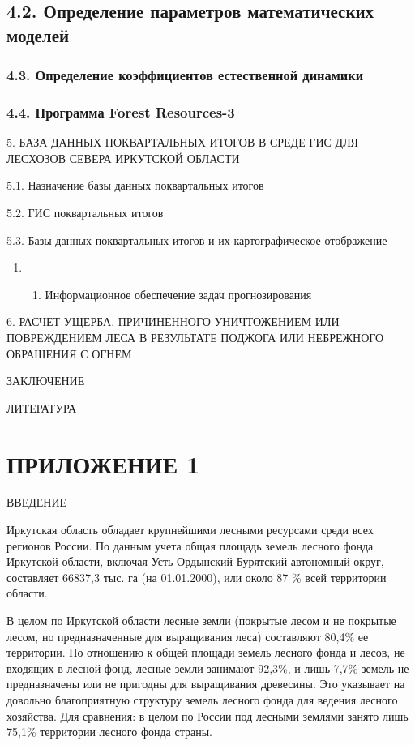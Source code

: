 \documentclass{report}
\begin{document}
\subsection[4.2. \ Определение параметров математических моделей ]{4.2.  Определение параметров математических моделей }
\subsubsection[4.3. \ Определение коэффициентов естественной динамики]{4.3.  Определение коэффициентов естественной
динамики}
\subsubsection[4.4. \ Программа Forest Resources{}-3]{4.4.  Программа Forest Resources-3}
5. БАЗА ДАННЫХ ПОКВАРТАЛЬНЫХ ИТОГОВ В СРЕДЕ ГИС ДЛЯ ЛЕСХОЗОВ СЕВЕРА ИРКУТСКОЙ ОБЛАСТИ

5.1.  Назначение базы данных поквартальных итогов

5.2.  ГИС поквартальных итогов

5.3.  Базы данных поквартальных итогов и их картографическое отображение

\begin{enumerate}
\item \begin{enumerate}
\item Информационное обеспечение задач прогнозирования
\end{enumerate}
\end{enumerate}
6. РАСЧЕТ УЩЕРБА, ПРИЧИНЕННОГО УНИЧТОЖЕНИЕМ ИЛИ ПОВРЕЖДЕНИЕМ ЛЕСА В РЕЗУЛЬТАТЕ ПОДЖОГА ИЛИ НЕБРЕЖНОГО ОБРАЩЕНИЯ С ОГНЕМ

ЗАКЛЮЧЕНИЕ

ЛИТЕРАТУРА

\section{ПРИЛОЖЕНИЕ 1}
ВВЕДЕНИЕ

Иркутская область обладает крупнейшими лесными ресурсами среди всех регионов России. По данным учета общая площадь
земель лесного фонда Иркутской области, включая Усть-Ордынский Бурятский автономный округ, составляет 66837,3 тыс. га
(на 01.01.2000), или около 87 \% всей территории области.

В целом по Иркутской области лесные земли (покрытые лесом и не покрытые лесом, но предназначенные для выращивания леса)
составляют 80,4\% ее территории. По отношению к общей площади земель лесного фонда и лесов, не входящих в лесной фонд,
лесные земли занимают 92,3\%, и лишь 7,7\% земель не предназначены или не пригодны для выращивания древесины. Это
указывает на довольно благоприятную структуру земель лесного фонда для ведения лесного хозяйства. Для сравнения: в
целом по России под лесными землями занято лишь 75,1\% территории лесного фонда страны.
\end{document}
